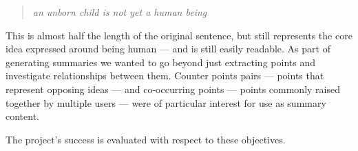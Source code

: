     \medskip
    \begin{center}
    \blockquote{\textit{an unborn child is not yet a human being}}
    \end{center}
    \medskip

    This is almost half the length of the original sentence, but still represents the core idea expressed around being human --- and is still easily readable. As part of generating summaries we wanted to go beyond just extracting points and investigate relationships between them. Counter points pairs --- points that represent opposing ideas --- and co-occurring points --- points commonly raised together by multiple users --- were of particular interest for use as summary content.

    \medskip

    The project's success is evaluated with respect to these objectives.
